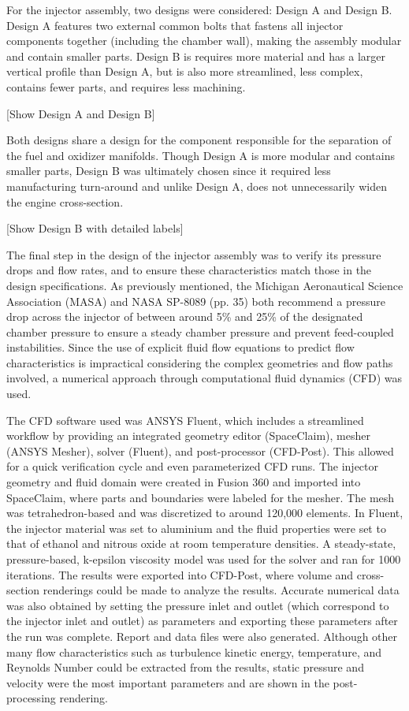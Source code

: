 \documentclass[9pt]{article} %
\numberwithin{equation}{section} %
\begin{document}
For the injector assembly, two designs were considered: Design A and Design B. Design A features two external common bolts that fastens all injector components together (including the chamber wall), making the assembly modular and contain smaller parts. Design B is requires more material and has a larger vertical profile than Design A, but is also more streamlined, less complex, contains fewer parts, and requires less machining.

[Show Design A and Design B]

Both designs share a design for the component responsible for the separation of the fuel and oxidizer manifolds. Though Design A is more modular and contains smaller parts, Design B was ultimately chosen since it required less manufacturing turn-around and unlike Design A, does not unnecessarily widen the engine cross-section.

[Show Design B with detailed labels]

The final step in the design of the injector assembly was to verify its pressure drops and flow rates, and to ensure these characteristics match those in the design specifications. As previously mentioned, the Michigan Aeronautical Science Association (MASA) and NASA SP-8089 (pp. 35) both recommend a pressure drop across the injector of between around 5\% and 25\% of the designated chamber pressure to ensure a steady chamber pressure and prevent feed-coupled instabilities. Since the use of explicit fluid flow equations to predict flow characteristics is impractical considering the complex geometries and flow paths involved, a numerical approach through computational fluid dynamics (CFD) was used. 

The CFD software used was ANSYS Fluent, which includes a streamlined workflow by providing an integrated geometry editor (SpaceClaim), mesher (ANSYS Mesher), solver (Fluent), and post-processor (CFD-Post). This allowed for a quick verification cycle and even parameterized CFD runs. The injector geometry and fluid domain were created in Fusion 360 and imported into SpaceClaim, where parts and boundaries were labeled for the mesher. The mesh was tetrahedron-based and was discretized to around 120,000 elements. In Fluent, the injector material was set to aluminium and the fluid properties were set to that of ethanol and nitrous oxide at room temperature densities. A steady-state, pressure-based, k-epsilon viscosity model was used for the solver and ran for 1000 iterations. The results were exported into CFD-Post, where volume and cross-section renderings could be made to analyze the results. Accurate numerical data was also obtained by setting the pressure inlet and outlet (which correspond to the injector inlet and outlet) as parameters and exporting these parameters after the run was complete. Report and data files were also generated. Although other many flow characteristics such as turbulence kinetic energy, temperature, and Reynolds Number could be extracted from the results, static pressure and velocity were the most important parameters and are shown in the post-processing rendering.
\end{document}
